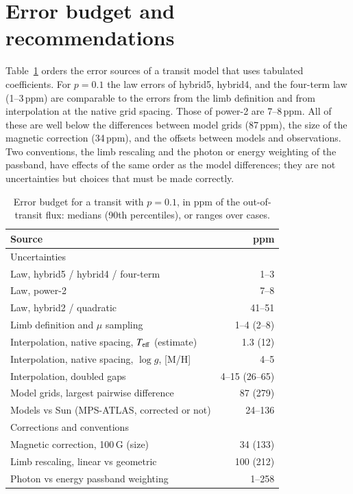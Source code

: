 \documentclass{aa}
\newcommand{\ppm}{\,\textrm{ppm}}
\newcommand{\teff}{T_{\rm eff}}
\begin{document}
\section{Error budget and recommendations}\label{sec:budget}
Table~\ref{tab:budget} orders the error sources of a transit model that uses
tabulated coefficients. For $p=0.1$ the law errors of hybrid5, hybrid4, and
the four-term law (1--3\ppm) are comparable to the errors from the limb
definition and from interpolation at the native grid spacing. Those of power-2
are 7--8\ppm. All of these are well below the differences between model
grids (87\ppm), the size of the magnetic correction (34\ppm), and the offsets
between models and observations. Two conventions, the limb rescaling and the
photon or energy weighting of the passband, have effects of the same order as
the model differences; they are not uncertainties but choices that must be
made correctly.

\begin{table}
\caption{Error budget for a transit with $p=0.1$, in ppm of the out-of-transit
flux: medians (90th percentiles), or ranges over cases.}
\label{tab:budget}
\centering
\small
\begin{tabular}{lr}
\hline\hline
Source & ppm\\
\hline
\multicolumn{2}{l}{Uncertainties}\\
Law, hybrid5 / hybrid4 / four-term & 1--3\\
Law, power-2 & 7--8\\
Law, hybrid2 / quadratic & 41--51\\
Limb definition and $\mu$ sampling & 1--4 (2--8)\\
Interpolation, native spacing, $\teff$ (estimate) & 1.3 (12)\\
Interpolation, native spacing, $\log g$, [M/H] & 4--5\\
Interpolation, doubled gaps & 4--15 (26--65)\\
Model grids, largest pairwise difference & 87 (279)\\
Models vs Sun (MPS-ATLAS, corrected or not) & 24--136\\
\multicolumn{2}{l}{Corrections and conventions}\\
Magnetic correction, 100\,G (size) & 34 (133)\\
Limb rescaling, linear vs geometric & 100 (212)\\
Photon vs energy passband weighting & 1--258\\
\hline
\end{tabular}
\end{table}
\end{document}
